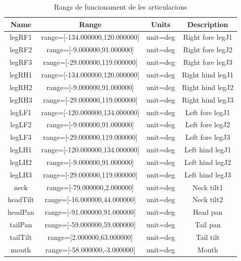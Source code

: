 \documentclass[12pt,a4paper,final,twoside]{article}
\begin{document}
\begin{table}[H]
\begin{center}
\begin{tabular}{| c | c | c | c |}
\hline
Name & Range & Units & Description\\ \hline \hline
legRF1    &    range=[-134.000000,120.000000]  & unit=deg & Right fore legJ1\\
legRF2    &    range=[-9.000000,91.000000]     & unit=deg & Right fore legJ2\\
legRF3    &    range=[-29.000000,119.000000]   & unit=deg & Right fore legJ3\\
legRH1    &    range=[-134.000000,120.000000]  & unit=deg & Right hind legJ1\\
legRH2    &    range=[-9.000000,91.000000]     & unit=deg & Right hind legJ2\\
legRH3    &    range=[-29.000000,119.000000]   & unit=deg & Right hind legJ3\\
legLF1    &    range=[-120.000000,134.000000]  & unit=deg & Left fore legJ1\\
legLF2    &    range=[-9.000000,91.000000]     & unit=deg & Left fore legJ2\\
legLF3    &    range=[-29.000000,119.000000]   & unit=deg & Left fore legJ3\\
legLH1    &    range=[-120.000000,134.000000]  & unit=deg & Left hind legJ1\\
legLH2    &    range=[-9.000000,91.000000]     & unit=deg & Left hind legJ2\\
legLH3    &    range=[-29.000000,119.000000]   & unit=deg & Left hind legJ3\\
neck      &    range=[-79.000000,2.000000]     & unit=deg & Neck tilt1\\
headTilt  &    range=[-16.000000,44.000000]    & unit=deg & Neck tilt2\\
headPan   &    range=[-91.000000,91.000000]    & unit=deg & Head pan\\
tailPan   &    range=[-59.000000,59.000000]    & unit=deg & Tail pan\\
tailTilt  &    range=[2.000000,63.000000]      & unit=deg & Tail tilt\\
mouth     &    range=[-58.000000,-3.000000]    & unit=deg & Mouth\\
\hline
\end{tabular}
\end{center}
\caption{Rangs de funcionament de les articulacions \cite{Urbi_Docs}}
\end{table}
\end{document}
